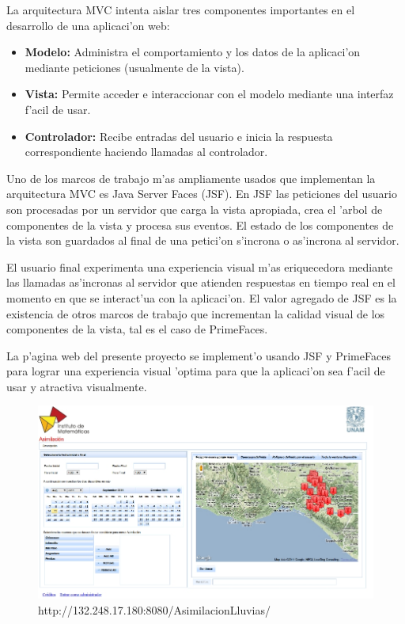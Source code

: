 La arquitectura MVC intenta aislar tres componentes importantes en el desarrollo
de una aplicaci'on web:

\begin{itemize}
 \item \textbf{Modelo:} Administra el comportamiento y los datos de la aplicaci'on mediante peticiones (usualmente de la vista).
\item \textbf{Vista:} Permite acceder e interaccionar con el modelo mediante una interfaz f'acil de usar.
\item \textbf{Controlador: } Recibe entradas del usuario e inicia la respuesta correspondiente haciendo llamadas al controlador.
\end{itemize}

Uno de los marcos de trabajo m'as ampliamente usados que implementan la arquitectura MVC es Java Server Faces (JSF). En JSF las
peticiones del usuario son procesadas por un servidor que carga la vista apropiada, crea el 'arbol de componentes de la vista y
procesa sus eventos. El estado de los componentes de la vista son guardados al final de una petici'on s'incrona o as'incrona al servidor.

El usuario final experimenta una experiencia visual m'as eriquecedora mediante las llamadas as'incronas al servidor que atienden
respuestas en tiempo real en el momento en que se interact'ua con la aplicaci'on. El valor agregado de JSF es la existencia de otros
marcos de trabajo que incrementan la calidad visual de los componentes de la vista, tal es el caso de PrimeFaces.

La p'agina web del presente proyecto se implement'o usando JSF y PrimeFaces para lograr una experiencia visual 'optima
para que la aplicaci'on sea f'acil de usar y atractiva visualmente.

\begin{figure}[!ht]
 \centering
 \includegraphics[width=180mm]{./imagenes/pagWeb.jpg}
 \caption{http://132.248.17.180:8080/AsimilacionLluvias/}
\end{figure}


